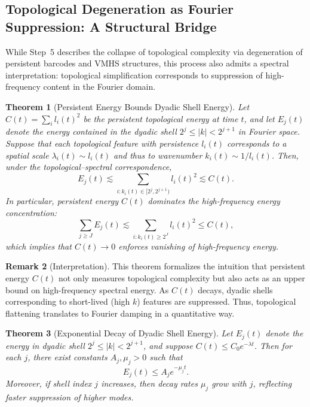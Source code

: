 \documentclass[11pt]{article}
\newtheorem{theorem}{Theorem}[section]
\theoremstyle{definition}
\newtheorem{remark}[theorem]{Remark}
\begin{document}
\subsection*{Topological Degeneration as Fourier Suppression: A Structural Bridge}

While Step~5 describes the collapse of topological complexity via degeneration of persistent barcodes and VMHS structures, this process also admits a spectral interpretation: topological simplification corresponds to suppression of high-frequency content in the Fourier domain.

\begin{theorem}[Persistent Energy Bounds Dyadic Shell Energy]
Let $C(t) = \sum_{i} l_i(t)^2$ be the persistent topological energy at time $t$, and let $E_j(t)$ denote the energy contained in the dyadic shell $2^j \le |k| < 2^{j+1}$ in Fourier space. Suppose that each topological feature with persistence $l_i(t)$ corresponds to a spatial scale $\lambda_i(t) \sim l_i(t)$ and thus to wavenumber $k_i(t) \sim 1/l_i(t)$. Then, under the topological–spectral correspondence,
\[
E_j(t) \lesssim \sum_{i : k_i(t) \in [2^j, 2^{j+1})} l_i(t)^2 \lesssim C(t).
\]
In particular, persistent energy $C(t)$ dominates the high-frequency energy concentration:
\[
\sum_{j \ge J} E_j(t) \lesssim \sum_{i : k_i(t) \ge 2^J} l_i(t)^2 \le C(t),
\]
which implies that $C(t) \to 0$ enforces vanishing of high-frequency energy.
\end{theorem}

\begin{remark}[Interpretation]
This theorem formalizes the intuition that persistent energy $C(t)$ not only measures topological complexity but also acts as an upper bound on high-frequency spectral energy. As $C(t)$ decays, dyadic shells corresponding to short-lived (high $k$) features are suppressed. Thus, topological flattening translates to Fourier damping in a quantitative way.
\end{remark}

\begin{theorem}[Exponential Decay of Dyadic Shell Energy]
Let $E_j(t)$ denote the energy in dyadic shell $2^j \le |k| < 2^{j+1}$, and suppose $C(t) \le C_0 e^{-\lambda t}$. Then for each $j$, there exist constants $A_j, \mu_j > 0$ such that
\[
E_j(t) \le A_j e^{-\mu_j t}.
\]
Moreover, if shell index $j$ increases, then decay rates $\mu_j$ grow with $j$, reflecting faster suppression of higher modes.
\end{theorem}
\end{document}
